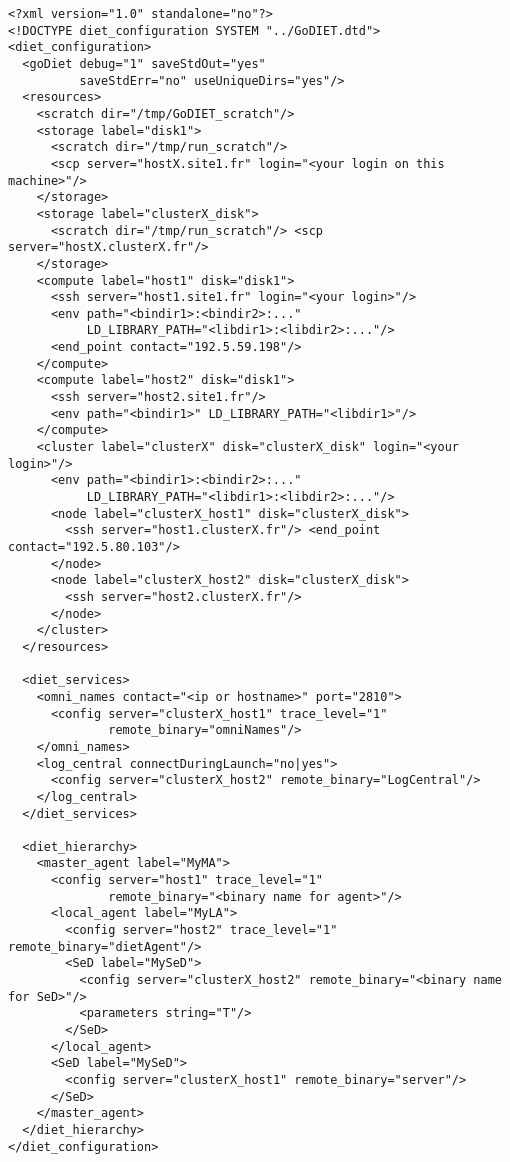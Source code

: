\begin{lstlisting}
<?xml version="1.0" standalone="no"?>
<!DOCTYPE diet_configuration SYSTEM "../GoDIET.dtd">
<diet_configuration>
  <goDiet debug="1" saveStdOut="yes" 
          saveStdErr="no" useUniqueDirs="yes"/>
  <resources>
    <scratch dir="/tmp/GoDIET_scratch"/>
    <storage label="disk1">
      <scratch dir="/tmp/run_scratch"/>
      <scp server="hostX.site1.fr" login="<your login on this machine>"/>
    </storage>
    <storage label="clusterX_disk">
      <scratch dir="/tmp/run_scratch"/> <scp server="hostX.clusterX.fr"/>
    </storage>
    <compute label="host1" disk="disk1">
      <ssh server="host1.site1.fr" login="<your login>"/>
      <env path="<bindir1>:<bindir2>:..."
           LD_LIBRARY_PATH="<libdir1>:<libdir2>:..."/>
      <end_point contact="192.5.59.198"/>
    </compute>
    <compute label="host2" disk="disk1">
      <ssh server="host2.site1.fr"/>
      <env path="<bindir1>" LD_LIBRARY_PATH="<libdir1>"/>
    </compute>
    <cluster label="clusterX" disk="clusterX_disk" login="<your login>"/>
      <env path="<bindir1>:<bindir2>:..."
           LD_LIBRARY_PATH="<libdir1>:<libdir2>:..."/>
      <node label="clusterX_host1" disk="clusterX_disk">
        <ssh server="host1.clusterX.fr"/> <end_point contact="192.5.80.103"/>
      </node>
      <node label="clusterX_host2" disk="clusterX_disk">
        <ssh server="host2.clusterX.fr"/>
      </node>
    </cluster>
  </resources>
 
  <diet_services>
    <omni_names contact="<ip or hostname>" port="2810">
      <config server="clusterX_host1" trace_level="1" 
              remote_binary="omniNames"/>
    </omni_names>
    <log_central connectDuringLaunch="no|yes">
      <config server="clusterX_host2" remote_binary="LogCentral"/>
    </log_central>
  </diet_services>
 
  <diet_hierarchy>
    <master_agent label="MyMA">
      <config server="host1" trace_level="1"
              remote_binary="<binary name for agent>"/>
      <local_agent label="MyLA">
        <config server="host2" trace_level="1" remote_binary="dietAgent"/>
        <SeD label="MySeD">
          <config server="clusterX_host2" remote_binary="<binary name for SeD>"/>
          <parameters string="T"/>
        </SeD>
      </local_agent>
      <SeD label="MySeD">
        <config server="clusterX_host1" remote_binary="server"/>
      </SeD>
    </master_agent>
  </diet_hierarchy>      
</diet_configuration>
\end{lstlisting}


